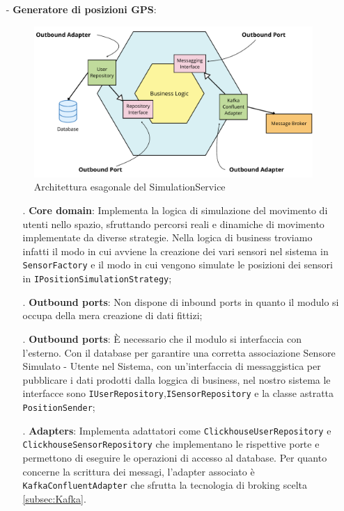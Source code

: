 \documentclass[10pt]{article}
\begin{document}
    \begin{itemize}
        \item[-] \textbf{Generatore di posizioni GPS}:
        \begin{figure}[h]
        \centering
        \includegraphics[width=\textwidth]{SimulationService.pdf}
        \caption{Architettura esagonale del SimulationService}
        \end{figure}
        \begin{itemize}
            \item[.] \textbf{Core domain}: Implementa la logica di simulazione del movimento di utenti nello spazio, sfruttando percorsi reali e dinamiche di movimento implementate da diverse strategie. Nella logica di business troviamo infatti il modo in cui avviene la creazione dei vari sensori nel sistema in \texttt{SensorFactory} e il modo in cui vengono simulate le posizioni dei sensori in \texttt{IPositionSimulationStrategy};
            \item[.] \textbf{Outbound ports}: Non dispone di inbound ports in quanto il modulo si occupa della mera creazione di dati fittizi;
            \item[.] \textbf{Outbound ports}: È necessario che il modulo si interfaccia con l'esterno. Con il database per garantire una corretta associazione Sensore Simulato - Utente nel Sistema, con un'interfaccia di messaggistica per pubblicare i dati prodotti dalla loggica di business, nel nostro sistema le interfacce sono \texttt{IUserRepository},\texttt{ISensorRepository} e la classe astratta \texttt{PositionSender};
            \sloppy
            \item[.] \textbf{Adapters}: Implementa adattatori come \texttt{ClickhouseUserRepository} e \texttt{ClickhouseSensorRepository} che implementano le rispettive porte e permettono di eseguire le operazioni di accesso al database. Per quanto concerne la scrittura dei messagi, l'adapter associato è \texttt{KafkaConfluentAdapter} che sfrutta la tecnologia di broking scelta \ref{subsec:Kafka}.
        \end{itemize}


\end{itemize}
\end{document}
